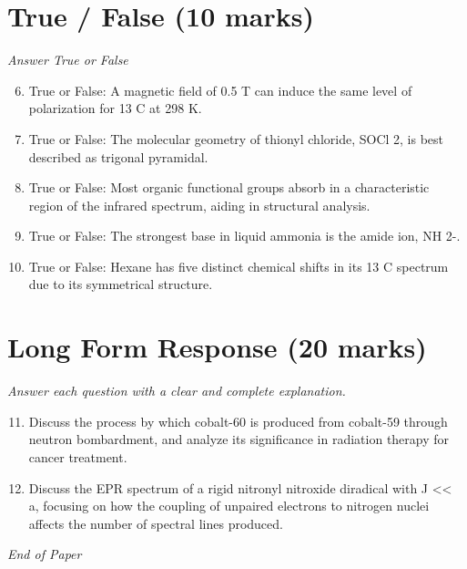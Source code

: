 \documentclass[12pt]{article}
\begin{document}
\section*{True / False (10 marks)}
\textit{Answer True or False}
\begin{enumerate}[label=\arabic*.]
\setcounter{enumi}{5}
\item True or False: A magnetic field of 0.5 T can induce the same level of polarization for 13 C at 298 K.
\item True or False: The molecular geometry of thionyl chloride, SOCl 2, is best described as trigonal pyramidal.
\item True or False: Most organic functional groups absorb in a characteristic region of the infrared spectrum, aiding in structural analysis.
\item True or False: The strongest base in liquid ammonia is the amide ion, NH 2-.
\item True or False: Hexane has five distinct chemical shifts in its 13 C spectrum due to its symmetrical structure.
\end{enumerate}

\section*{Long Form Response (20 marks)}
\textit{Answer each question with a clear and complete explanation.}
\begin{enumerate}[label=\arabic*.]
\setcounter{enumi}{10}
\item Discuss the process by which cobalt-60 is produced from cobalt-59 through neutron bombardment, and analyze its significance in radiation therapy for cancer treatment.
\item Discuss the EPR spectrum of a rigid nitronyl nitroxide diradical with J \textless{}\textless{} a, focusing on how the coupling of unpaired electrons to nitrogen nuclei affects the number of spectral lines produced.
\end{enumerate}

\vfill
\noindent\textit{End of Paper}
\end{document}
